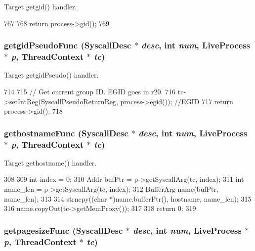 Target getgid() handler. 


\begin{DoxyCode}
767 {
768     return process->gid();
769 }
\end{DoxyCode}
\hypertarget{syscall__emul_8hh_aaa6dbbc64e20f7cc39483464fbdace9d}{
\subsubsection[{getgidPseudoFunc}]{ getgidPseudoFunc ({\bf SyscallDesc} $\ast$ {\em desc}, \/  int {\em num}, \/  {\bf LiveProcess} $\ast$ {\em p}, \/  {\bf ThreadContext} $\ast$ {\em tc})}}
\label{syscall__emul_8hh_aaa6dbbc64e20f7cc39483464fbdace9d}


Target getgidPseudo() handler. 


\begin{DoxyCode}
714 {
715     // Get current group ID.  EGID goes in r20.
716     tc->setIntReg(SyscallPseudoReturnReg, process->egid()); //EGID
717     return process->gid();
718 }
\end{DoxyCode}
\hypertarget{syscall__emul_8hh_a82c247bc55c192c038a032fb9bcb884a}{
\subsubsection[{gethostnameFunc}]{ gethostnameFunc ({\bf SyscallDesc} $\ast$ {\em desc}, \/  int {\em num}, \/  {\bf LiveProcess} $\ast$ {\em p}, \/  {\bf ThreadContext} $\ast$ {\em tc})}}
\label{syscall__emul_8hh_a82c247bc55c192c038a032fb9bcb884a}


Target gethostname() handler. 


\begin{DoxyCode}
308 {
309     int index = 0;
310     Addr bufPtr = p->getSyscallArg(tc, index);
311     int name_len = p->getSyscallArg(tc, index);
312     BufferArg name(bufPtr, name_len);
313 
314     strncpy((char *)name.bufferPtr(), hostname, name_len);
315 
316     name.copyOut(tc->getMemProxy());
317 
318     return 0;
319 }
\end{DoxyCode}
\hypertarget{syscall__emul_8hh_a5961ea78f5b078d3c0881362b6992b3a}{
\subsubsection[{getpagesizeFunc}]{ getpagesizeFunc ({\bf SyscallDesc} $\ast$ {\em desc}, \/  int {\em num}, \/  {\bf LiveProcess} $\ast$ {\em p}, \/  {\bf ThreadContext} $\ast$ {\em tc})}}
\label{syscall__emul_8hh_a5961ea78f5b078d3c0881362b6992b3a}


